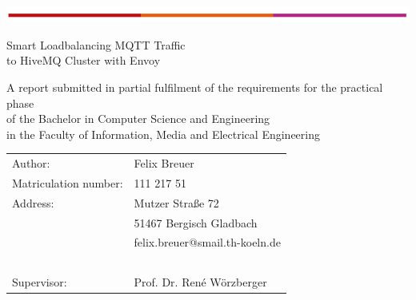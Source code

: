 \begin{titlepage}
\begin{flushleft}
	\vspace*{-1cm}
	\includegraphics[scale=1]{images/th-bar.png}\\
	\vspace*{1cm}
\end{flushleft}
\begin{center}
\begin{huge}
Smart Loadbalancing MQTT Traffic\\
to HiveMQ Cluster with Envoy\\
\end{huge}
\vspace{2cm}
A report submitted in partial fulfilment of the requirements for the practical phase \\of the Bachelor in Computer Science and Engineering \\in the Faculty of Information, Media and Electrical Engineering
\end{center}
\vspace{4cm}
\noindent\begin{tabular}{ll}
	Author: & Felix Breuer \\
	Matriculation number: &	111 217 51 \\
	Address: & Mutzer Stra{\ss}e 72 \\
	~ &	51467 Bergisch Gladbach \\
	~ &	felix.breuer@smail.th-koeln.de \\
	~ & ~ \\
	Supervisor: & Prof. Dr. René Wörzberger
\end{tabular}
~\\
~\\
~\\
~\\
~\\
~\\
\end{titlepage}
\newpage

